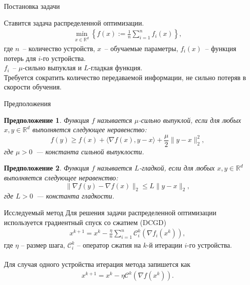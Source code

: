 \documentclass{beamer}
\newtheorem{myassumption}{Предположение}
\begin{document}
\begin{frame}{Постановка задачи}

    Ставится задача распределенной оптимизации.
    \begin{align*}
     \min_{x \in \mathbb{R}^d}\left\{f(x) := \frac{1}{n}\sum\limits_{i = 1}^n f_i(x) \right\},
    \end{align*}
    где $n$~-- количество устройств, $x$~-- обучаемые параметры, $f_i(x)$~-- функция потерь для $i$-го устройства.\\
    $f_i$~-- $\mu$-сильно выпуклая и $L$-гладкая функция.\\
    Требуется сократить количество передаваемой информации, не сильно потеряв в скорости обучения.

\end{frame}

\begin{frame}{Предположения}
    \begin{myassumption}
        Функция $f$ называется $\mu$-сильно выпуклой, если для любых $x, y \in \mathbb{R}^d$ выполняется следующее неравенство:
        \begin{equation}
            f(y) \geq f(x) + \langle \nabla f(x), y - x \rangle + \frac{\mu}{2} \|y - x\|_2^2, \label{eq:strong_convexity}
        \end{equation}
        где $\mu > 0$~--- константа сильной выпуклости.
    \end{myassumption}

    \begin{myassumption}
        Функция $f$ называется $L$-гладкой, если для любых $x, y \in \mathbb{R}^d$ выполняется следующее неравенство:
        \begin{equation}
            \|\nabla f(y) - \nabla f(x)\|_2 \leq L \|y - x\|_2, \label{eq:smoothness}
        \end{equation}
        где $L > 0$~--- константа гладкости.
    \end{myassumption}
\end{frame}


\begin{frame}{Исследуемый метод}
    Для решения задачи распределенной оптимизации используется градиентный спуск со сжатием (DCGD)
    \begin{align*}
     x^{k + 1} = x^k - \frac{\eta}{n} \sum\limits_{i = 1}^n\mathcal{C}_i^k(\nabla f_i(x^k)),
    \end{align*}
    где $\eta$ -- размер шага, $\mathcal{C}_i^k$ -- оператор сжатия на $k$-й итерации $i$-го устройства.\\

    $ $\\
    Для случая одного устройства итерация метода запишется как
    \begin{align*}
     x^{k + 1} = x^k - \eta\mathcal{C}^k(\nabla f(x^k)).
    \end{align*}
\end{frame}
\end{document}
